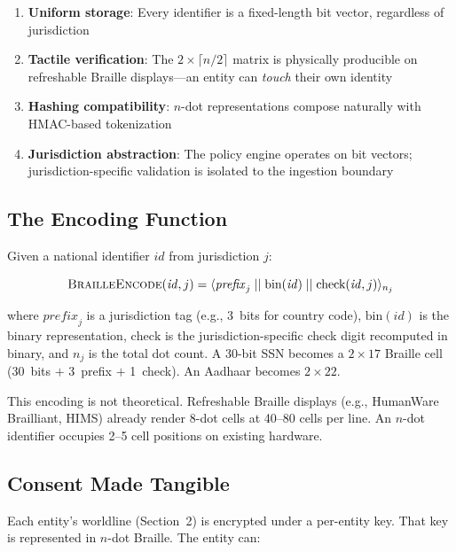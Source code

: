 \documentclass[11pt,twocolumn]{article}
\begin{document}
\begin{enumerate}[nosep,leftmargin=1.5em]
  \item \textbf{Uniform storage}: Every identifier is a fixed-length bit vector, regardless of jurisdiction
  \item \textbf{Tactile verification}: The $2 \times \lceil n/2 \rceil$ matrix is physically producible on refreshable Braille displays---an entity can \emph{touch} their own identity
  \item \textbf{Hashing compatibility}: $n$-dot representations compose naturally with HMAC-based tokenization
  \item \textbf{Jurisdiction abstraction}: The policy engine operates on bit vectors; jurisdiction-specific validation is isolated to the ingestion boundary
\end{enumerate}

\subsection{The Encoding Function}
\label{sec:encoding}

Given a national identifier $\mathit{id}$ from jurisdiction $j$:

\begin{equation}
\textsc{BrailleEncode}(\mathit{id}, j) = \langle \mathit{prefix}_j \;||\; \text{bin}(\mathit{id}) \;||\; \text{check}(\mathit{id}, j) \rangle_{n_j}
\end{equation}

where $\mathit{prefix}_j$ is a jurisdiction tag (e.g., 3~bits for country code), $\text{bin}(\mathit{id})$ is the binary representation, $\text{check}$ is the jurisdiction-specific check digit recomputed in binary, and $n_j$ is the total dot count. A 30-bit SSN becomes a $2 \times 17$ Braille cell (30~bits $+$ 3~prefix $+$ 1~check). An Aadhaar becomes $2 \times 22$.

This encoding is not theoretical. Refreshable Braille displays (e.g., HumanWare Brailliant, HIMS) already render 8-dot cells at 40--80 cells per line. An $n$-dot identifier occupies 2--5 cell positions on existing hardware.

\subsection{Consent Made Tangible}

Each entity's worldline (Section~2) is encrypted under a per-entity key. That key is represented in $n$-dot Braille. The entity can:
\end{document}
